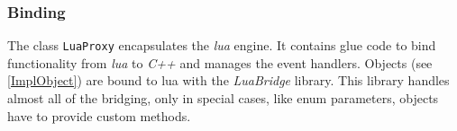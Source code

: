 \subsubsection{Binding}
The class \lstinline{LuaProxy} encapsulates the \textit{lua} engine.
It contains glue code to bind functionality from \textit{lua} to \textit{C++} and manages the event handlers.
Objects (see \ref{ImplObject}) are bound to lua with the \textit{LuaBridge} library.
This library handles almost all of the bridging, only in special cases, like enum parameters, objects have to provide custom methods.


